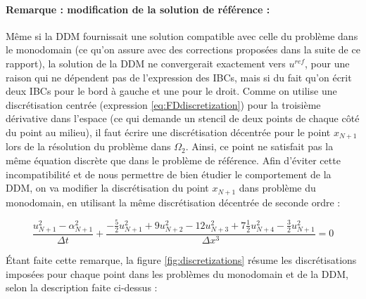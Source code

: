 \paragraph{Remarque : modification de la solution de référence :}

\indent Même si la DDM fournissait une solution compatible avec celle du problème dans le monodomain (ce qu'on assure avec des corrections proposées dans la suite de ce rapport), la solution de la DDM ne convergerait exactement vers $u^{ref}$, pour une raison qui ne dépendent pas de l'expression des IBCs, mais si du fait qu'on écrit deux IBCs pour le bord à gauche et une pour le droit. Comme on utilise une discrétisation centrée (expression \ref{eq:FDdiscretization}) pour la troisième dérivative dans l'espace (ce qui demande un stencil de deux points de chaque côté du point au milieu), il faut écrire une discrétisation décentrée pour le point $x_{N+1}$  lors de la résolution du problème dans $\Omega_2$. Ainsi, ce point ne satisfait pas la même équation discrète que dans le problème de référence. Afin d'éviter cette incompatibilité et de nous permettre de bien étudier le comportement de la DDM, on va modifier la discrétisation du point  $x_{N+1}$ dans problème du monodomain, en utilisant la même discrétisation décentrée de seconde ordre :

\begin{equation*}
    \label{eq:uncenteredFDdiscretizationN}
    \frac{u_{N+1}^2 - \alpha_{N+1}^2}{\Delta t} + \frac{-\frac{5}{2}u_{N+1}^2 + 9u_{N+2}^2 - 12 u_{N+3}^2 + 7\frac{1}{2}u_{N+4}^2 -\frac{3}{2}u_{N+1}^2}{\Delta x ^3} = 0
\end{equation*}

\indent Étant faite cette remarque, la figure \ref{fig:discretizations} résume les discrétisations imposées pour chaque point dans les problèmes du monodomain et de la DDM, selon la description faite ci-dessus :

\indent


